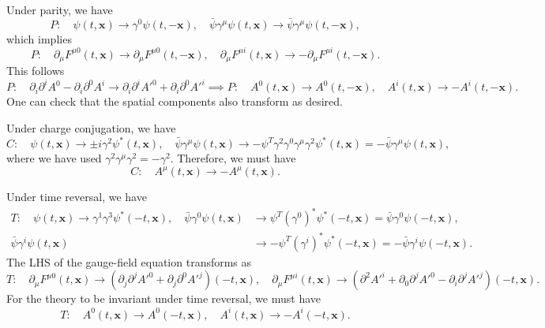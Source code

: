 \begin{solution}
    Under parity, we have
    \begin{equation}
        P: \quad \psi(t,\mathbf{x}) \to \gamma^0\psi(t,-\mathbf{x}), \quad \bar \psi \gamma^\mu \psi(t,\mathbf{x}) \to   \bar \psi\gamma^\mu \psi(t,-\mathbf{x}),
    \end{equation}
    which implies
    \begin{equation}
        P: \quad \partial_\mu F^{\mu 0}(t,\mathbf{x}) \to \partial_\mu F^{\mu 0}(t,-\mathbf{x}), \quad \partial_\mu F^{\mu i}(t,\mathbf{x}) \to - \partial_\mu F^{\mu i}(t,-\mathbf{x}).
    \end{equation}
    This follows
    \begin{equation}
        P: \quad \partial_i\partial^i A^0 - \partial_i \partial^0 A^i \to  \partial_i\partial^i A'^0 + \partial_i \partial^0 A'^i \implies P:\quad A^0(t,\mathbf{x}) \to A^0(t,-\mathbf{x}), \quad A^i(t,\mathbf{x}) \to -A^i(t,-\mathbf{x}).
    \end{equation}
    One can check that the spatial components also transform as desired.

    Under charge conjugation, we have
    \begin{equation}
        C: \quad \psi(t,\mathbf{x}) \to \pm i \gamma^2 \psi^* (t,\mathbf{x}), \quad \bar \psi \gamma^\mu \psi(t,\mathbf{x}) \to -\psi^T\gamma^2 \gamma^0 \gamma^\mu \gamma^2 \psi^* (t,\mathbf{x}) = -\bar \psi \gamma^\mu \psi (t,\mathbf{x}),
    \end{equation}
    where we have used $\gamma^2 \gamma^\mu \gamma^2 = - \gamma^2$.
    Therefore, we must have
    \begin{equation}
        C: \quad A^\mu (t,\mathbf{x}) \to -A^\mu (t,\mathbf{x}) .
    \end{equation}

    Under time reversal, we have
    \begin{equation}
    \begin{aligned}
        T: \quad \psi(t,\mathbf{x})  \to \gamma^1\gamma^3 \psi^*(-t,\mathbf{x}), \quad \bar \psi\gamma^0 \psi (t,\mathbf{x}) &\to   \psi^T (\gamma^0)^*\psi^*(-t,\mathbf{x}) =  \bar \psi \gamma^0\psi(-t,\mathbf{x}),\\  \bar \psi\gamma^i \psi (t,\mathbf{x}) &\to   -\psi^T (\gamma^i)^*\psi^*(-t,\mathbf{x}) =  -\bar \psi \gamma^i\psi(-t,\mathbf{x}).
    \end{aligned}
    \end{equation}
    The LHS of the gauge-field equation transforms as
    \begin{equation}
        T: \quad \partial_\mu F^{\mu0}(t,\mathbf{x}) \to (\partial_j \partial^j A'^0  + \partial_j \partial^0 A'^j)(-t,\mathbf{x}), \quad \partial_\mu F^{\mu i}(t,\mathbf{x}) \to (\partial^2A'^i + \partial_0 \partial^j A'^0 - \partial_i \partial^jA'^j)(-t,\mathbf{x}).
    \end{equation}
    For the theory to be invariant under time reversal, we must have
    \begin{equation}
        T: \quad A^0(t,\mathbf{x}) \to A^0(-t,\mathbf{x}), \quad A^i(t,\mathbf{x}) \to - A^i(-t,\mathbf{x}).
    \end{equation}


\end{solution}
